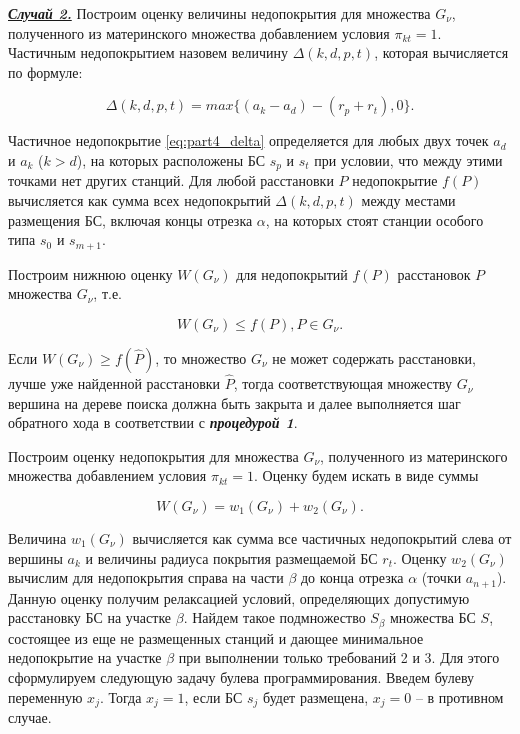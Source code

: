 \underline{\textit{\textbf{Случай 2.}}}
Построим оценку величины недопокрытия для множества $G_\nu$, полученного из материнского множества добавлением условия $\pi_{kt}=1$. Частичным недопокрытием назовем величину $\Delta(k,d,p,t)$, которая вычисляется по формуле:

\begin{equation}\label{eq:part4_delta}
\Delta(k,d,p,t) = max\{\left(a_{k} - a_{d} \right) - \left(r_{p} + r_{t} \right), 0\}.
\end{equation}

Частичное недопокрытие \cref{eq:part4_delta} определяется для любых двух точек $a_d$ и $a_k$ ($k>d$), на которых расположены БС $s_p$ и $s_t$ при условии, что между этими точками нет других станций. Для любой расстановки $P$ недопокрытие $f(P)$ вычисляется как сумма всех недопокрытий $\Delta(k,d,p,t)$ между местами размещения БС, включая концы отрезка $\alpha$, на которых стоят станции особого типа $s_0$ и $s_{m+1}$.

Построим нижнюю оценку $W(G_{\nu} )$ для недопокрытий $f(P)$ расстановок $P$ множества $G_\nu$, т.е. 

\begin{displaymath}
W(G_\nu) \leq f(P), P \in G_\nu. 
\end{displaymath}

Если $W(G_\nu) \geq f(\widehat{P})$, то множество $G_\nu$ не может содержать расстановки, лучше уже найденной расстановки $\widehat{P}$, тогда соответствующая множеству $G_\nu$  вершина на дереве поиска должна быть закрыта и далее выполняется шаг обратного хода в соответствии с  \textit{\textbf{процедурой 1}}. 

Построим оценку недопокрытия для множества $G_\nu$, полученного из материнского множества добавлением условия $\pi_{kt}=1$. Оценку будем искать в виде суммы

\begin{equation}\label{eq:part2_noncoverage_estimation}
  W\left(G_\nu\right) = w_1 \left(G_\nu \right) + w_2 \left(G_\nu \right). 
\end{equation}

Величина $w_1 \left(G_\nu \right)$ вычисляется как сумма все частичных недопокрытий слева от вершины $a_k$ и величины радиуса покрытия размещаемой БС $r_t$. Оценку $w_2 \left(G_\nu \right)$ вычислим для недопокрытия справа на части $\beta$ до конца отрезка $\alpha$ (точки $a_{n+1}$). Данную оценку получим релаксацией условий, определяющих допустимую расстановку БС на участке $\beta$. Найдем такое подмножество $S_\beta$ множества БС $S$, состоящее из еще не размещенных станций и дающее минимальное недопокрытие на участке $\beta$ при выполнении только требований 2 и 3. Для этого сформулируем следующую задачу булева программирования. Введем булеву переменную $x_j$. Тогда $x_j = 1$, если БС $s_j$ будет размещена, $x_j = 0$ -- в противном случае.


